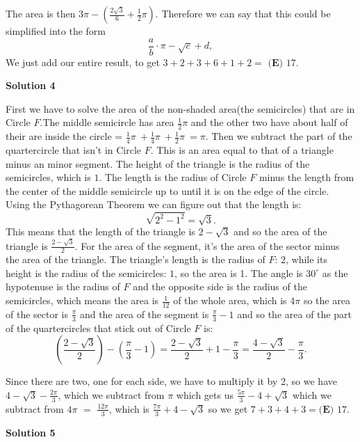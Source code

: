 \begin{enumerate}
 The area is then \( 3\pi - (\frac{2\sqrt{3}}{6} + \frac{1}{2} \pi) \). Therefore we can say that this could be simplified into the form
 \[\frac{a}{b} \cdot \pi - \sqrt{c} + d,\]We just add our entire result, to get \( 3 + 2 + 3 + 6 + 1 + 2 = \) \(\boxed{\textbf{(E) } 17}\).

 



\textbf{Solution 4}

First we have to solve the area of the non-shaded area(the semicircles) that are in Circle $F$.The middle semicircle has area $\frac12\pi$ and the other two have about half of their are inside the circle = $\frac14\pi\ + \frac14\pi\ + \frac12\pi\ = \pi$. Then we subtract the part of the quartercircle that isn't in Circle $F$. This is an area equal to that of a triangle minus an minor segment. The height of the triangle is the radius of the semicircles, which is $1$. The length is the radius of Circle $F$ minus the length from the center of the middle semicircle up to until it is on the edge of the circle. Using the Pythagorean Theorem we can figure out that the length is: 
 \[\sqrt{2^2 - 1^2} = \sqrt{3}.\] This means that the length of the triangle is $2 - \sqrt{3}$ and so the area of the triangle is $\frac{2 - \sqrt{3}}{2}$. For the area of the segment, it's the area of the sector minus the area of the triangle. The triangle's length is the radius of $F$: $2$, while its height is the radius of the semicircles: $1$, so the area is 1. The  angle is $30^{\circ}$ as the hypotenuse is the radius of $F$ and the opposite side is the radius of the semicircles, which means the area is $\frac{1}{12}$ of the whole area, which is $4\pi$ so the area of the sector is $\frac{\pi}{3}$ and the area of the segment is $\frac{\pi}{3} - 1$ and so the area of the part of the quartercircles that stick out of Circle $F$ is: 
 \[(\frac{2 - \sqrt{3}}{2})-(\frac{\pi}{3} - 1) = \frac{2 - \sqrt{3}}{2} + 1 - \frac{\pi}{3} = \frac{4 - \sqrt{3}}{2} - \frac{\pi}{3}.\]

 Since there are two, one for each side, we have to multiply it by 2, so we have ${4 - \sqrt{3}} - \frac{2\pi}{3}$, which we subtract from $\pi$ which gets us $\frac{5\pi}{3} - 4 + \sqrt{3}$ which we subtract from $4\pi$ $=$ $\frac{12\pi}{3}$, which is $\frac{7\pi}{3} + 4 - \sqrt{3}$ so we get $7+3+4+3=\boxed{\textbf{(E) } 17}$.

 



\textbf{Solution 5}



\end{enumerate}
